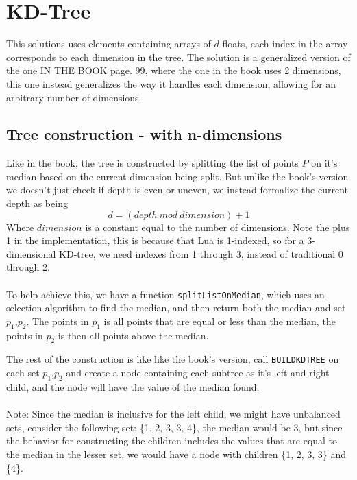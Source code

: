 \documentclass{article}
\begin{document}
\section{KD-Tree}
This solutions uses elements containing arrays of $d$ floats, each index in the array corresponds to each dimension in the tree.
The solution is a generalized version of the one IN THE BOOK page. 99, where the one in the book uses 2 dimensions, this one instead
generalizes the way it handles each dimension, allowing for an arbitrary number of dimensions.
\subsection{Tree construction - with n-dimensions}
Like in the book, the tree is constructed by splitting the list of points $P$ on it's median based on the current dimension being split.
But unlike the book's version we doesn't just check if depth is even or uneven, we instead formalize the current depth as being
\[
 d = (depth\ mod\ dimension)+1
\]
Where $dimension$ is a constant equal to the number of dimensions.
Note the plus 1 in the implementation, this is because that Lua is 1-indexed, so for a 3-dimensional KD-tree, we need indexes from 1 through 3,
instead of traditional 0 through 2.\\
 \\
To help achieve this, we have a function \texttt{splitListOnMedian}, which uses an selection algorithm to find the median, and then return both the median and set $p_1$,$p_2$.
The points in $p_1$ is all points that are equal or less than the median, the points in $p_2$ is then all points above the median.

The rest of the construction is like like the book's version, call \texttt{BUILDKDTREE} on each set $p_1$,$p_2$ and create a node containing each subtree as it's left and right child, 
and the node will have the value of the median found.\\
 \\
Note: Since the median is inclusive for the left child, we might have unbalanced sets, consider the following set: \{1, 2, 3, 3, 4\}, the median would be 3, but since the behavior for
constructing the children includes the values that are equal to the median in the lesser set, we would have a node with children \{1, 2, 3, 3\} and \{4\}.
\end{document}
